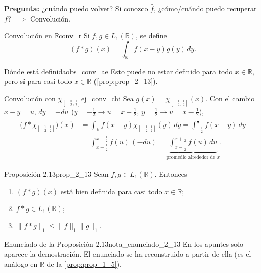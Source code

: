 \textbf{Pregunta:} ¿cuándo puedo volver? Si conozco $\hat{f}$, ¿cómo/cuándo puedo recuperar $f$? $\implies$ Convolución.

\begin{definicion}{Convolución en $\mathbb{R}$}{conv_r}
Si $f, g \in L_1(\mathbb{R})$, se define
\[
(f * g)(x) = \int_{\mathbb{R}}f(x - y)g(y)\,dy.
\]
\end{definicion}

\begin{observacion}{Dónde está definida}{obs_conv_ae}
Esto puede no estar definido para todo $x \in \mathbb{R}$, pero sí para casi todo $x \in \mathbb{R}$ (\cref{prop:prop_2_13}).
\end{observacion}

\begin{ejemplo}{Convolución con $\chi_{[-\frac12,\frac12]}$}{ej_conv_chi}
Sea $g(x) = \chi_{[-\frac12,\frac12]}(x)$. Con el cambio $x - y = u$, $dy = -du$ ($y = -\frac12 \to u = x + \frac12$, $y = \frac12 \to u = x - \frac12$),
\begin{align*}
\big(f * \chi_{[-\frac12,\frac12]}\big)(x) &= \int_{\mathbb{R}}f(x - y)\chi_{[-\frac12,\frac12]}(y)\,dy = \int_{-\frac12}^{\frac12}f(x - y)\,dy \\
&= \int_{x+\frac12}^{x-\frac12}f(u)\,(-du) = \underbrace{\int_{x-\frac12}^{x+\frac12}f(u)\,du}_{\text{promedio alrededor de } x}.
\end{align*}
\end{ejemplo}

\begin{proposicion}{Proposición 2.13}{prop_2_13}
Sean $f, g \in L_1(\mathbb{R})$. Entonces
\begin{enumerate}
\item[(1)] $(f * g)(x)$ está bien definida para casi todo $x \in \mathbb{R}$;
\item[(2)] $f * g \in L_1(\mathbb{R})$;
\item[(3)] $\|f * g\|_1 \le \|f\|_1\|g\|_1$.
\end{enumerate}
\end{proposicion}

\begin{nota}{Enunciado de la Proposición 2.13}{nota_enunciado_2_13}
En los apuntes solo aparece la demostración. El enunciado se ha reconstruido a partir de ella (es el análogo en $\mathbb{R}$ de la \cref{prop:prop_1_5}).
\end{nota}

